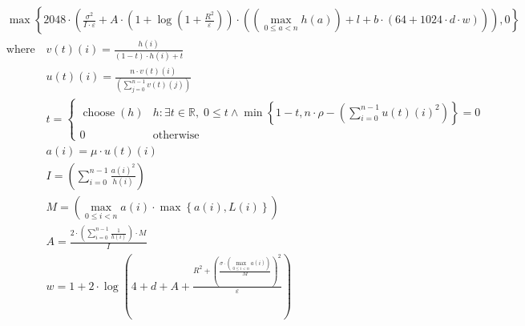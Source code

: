 \[\begin{aligned} &\max\left\{ 2048 \cdot \left(\frac{\sigma^{2}}{I \cdot \varepsilon} + A \cdot \left(1 + \log\left(1 + \frac{R^{2}}{\varepsilon}\right)\right) \cdot \left(\left(\max_{0\le a<n} h\left(a\right)\right) + l + b \cdot \left(64 + 1024 \cdot d \cdot w\right)\right)\right), 0 \right\} \\ &\text{where}\quad v\left(t\right)\left(i\right) = \frac{h\left(i\right)}{\left(1 - t\right) \cdot h\left(i\right) + t} \\ &\phantom{\text{where}\quad} u\left(t\right)\left(i\right) = \frac{n \cdot v\left(t\right)\left(i\right)}{\left(\sum_{j=0}^{n-1} v\left(t\right)\left(j\right)\right)} \\ &\phantom{\text{where}\quad} t = \begin{cases} \operatorname{choose}\left(h\right) & h : \exists t\in \mathbb{R},\;0 \leq t \land \min\left\{ 1 - t, n \cdot \rho - \left(\sum_{i=0}^{n-1} u\left(t\right)\left(i\right)^{2}\right) \right\} = 0 \\ 0 & \mathrm{otherwise} \end{cases} \\ &\phantom{\text{where}\quad} a\left(i\right) = \mu \cdot u\left(t\right)\left(i\right) \\ &\phantom{\text{where}\quad} I = \left(\sum_{i=0}^{n-1} \frac{a\left(i\right)^{2}}{h\left(i\right)}\right) \\ &\phantom{\text{where}\quad} M = \left(\max_{0\le i<n} a\left(i\right) \cdot \max\left\{ a\left(i\right), L\left(i\right) \right\}\right) \\ &\phantom{\text{where}\quad} A = \frac{2 \cdot \left(\sum_{i=0}^{n-1} \frac{1}{h\left(i\right)}\right) \cdot M}{I} \\ &\phantom{\text{where}\quad} w = 1 + 2 \cdot \log\left(4 + d + A + \frac{R^{2} + \left(\frac{\sigma \cdot \left(\max_{0\le i<n} a\left(i\right)\right)}{M}\right)^{2}}{\varepsilon}\right)\end{aligned}\]
